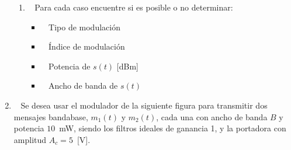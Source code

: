 \begin{enumerate}
\begin{enumerate}
	
	\item~ Para cada caso encuentre si es posible o no determinar:
	
	\begin{itemize}
		
		\item~ Tipo de modulación
		\item~ Índice de modulación
		\item~ Potencia de $s(t)$ [dBm]
		\item~ Ancho de banda de $s(t)$
		
	\end{itemize}
	
\end{enumerate}


\item~
Se desea usar el modulador de la siguiente figura para transmitir dos mensajes  bandabase, $m_1(t)$ y $m_2(t)$, cada una con ancho de banda $B$ y potencia $10$~mW, siendo los filtros ideales de ganancia 1, y la portadora con amplitud $A_c=5$~[V].


\end{enumerate}

